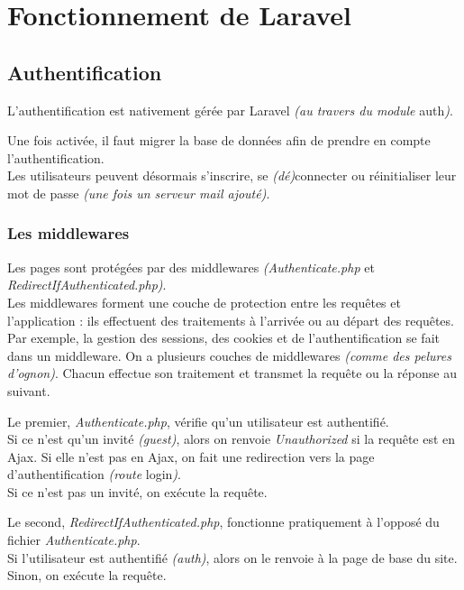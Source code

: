 \section{Fonctionnement de Laravel}
\label{sec:laravel_functioning}


\subsection{Authentification}
\label{subsec:auth}
L'authentification est nativement gérée par Laravel \textit{(au travers du module} auth\textit{)}.

Une fois activée, il faut migrer la base de données afin de prendre en compte l'authentification.\\
Les utilisateurs peuvent désormais s'inscrire, se \textit{(dé)}connecter ou réinitialiser leur mot de passe \textit{(une fois un serveur mail ajouté)}.

\subsubsection{Les middlewares}
\label{sec:middlewares}
Les pages sont protégées par des middlewares \textit{(Authenticate.php} et \textit{RedirectIfAuthenticated.php)}. \\
Les middlewares forment une couche de protection entre les requêtes et l'application : ils effectuent des traitements à l'arrivée ou au départ des requêtes. \\
Par exemple, la gestion des sessions, des cookies et de l'authentification se fait dans un middleware. On a plusieurs couches de middlewares \textit{(comme des pelures d'ognon)}. Chacun effectue son traitement et transmet la requête ou la réponse au suivant.

Le premier, \textit{Authenticate.php}, vérifie qu'un utilisateur est authentifié. \\  
Si ce n'est qu'un invité \textit{(guest)}, alors on renvoie \textit{Unauthorized} si la requête est en Ajax. Si elle n'est pas en Ajax, on fait une redirection vers la page d'authentification \textit{(route} login\textit{)}. \\
Si ce n'est pas un invité, on exécute la requête.

Le second, \textit{RedirectIfAuthenticated.php}, fonctionne pratiquement à l'opposé du fichier \textit{Authenticate.php}. \\
Si l'utilisateur est authentifié \textit{(auth)}, alors on le renvoie à la page de base du site. \\
Sinon, on exécute la requête.


